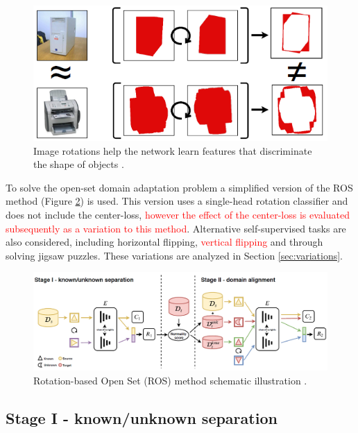 \documentclass[10pt,twocolumn,letterpaper]{article}
\begin{document}
\begin{figure}[!htb]
  \centering
   \includegraphics[width=0.9\linewidth]{Figures/RotationFeatures.png}
   \caption{Image rotations help the network learn features that discriminate the shape of objects \cite{Bucci2020}.}
   \label{fig:RotationFeatures}
\end{figure}

To solve the open-set domain adaptation problem a simplified version of the ROS method (Figure \ref{fig:ROS}) is used. This version uses a single-head rotation classifier and does not include the center-loss, \textcolor{red}{however the effect of the center-loss is evaluated subsequently as a variation to this method}. Alternative self-supervised tasks are also considered, including horizontal flipping, \textcolor{red}{vertical flipping} and through solving jigsaw puzzles. These variations are analyzed in Section \ref{sec:variations}.

\begin{figure}[!htb]
  \centering
   \includegraphics[width=0.9\linewidth]{Figures/ROS.png}
   \caption{Rotation-based Open Set (ROS) method schematic illustration \cite{Bucci2020}.}
   \label{fig:ROS}
\end{figure}

\subsection{Stage I - known/unknown separation}
\end{document}
